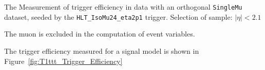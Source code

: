 The Measurement of trigger efficiency in data with an orthogonal \verb!SingleMu! dataset, seeded by the \verb!HLT_IsoMu24_eta2p1! trigger.
Selection of sample: $|\eta| < 2.1$

The muon is excluded in the computation of event variables.



The trigger efficiency measured for a signal model is shown in Figure~\ref{fig:T1ttt_Trigger_Efficiency}


\begin{figure}[h!]
  \begin{center}
     ~~
     \\
     ~~
     \\

\end{center}
\end{figure}
